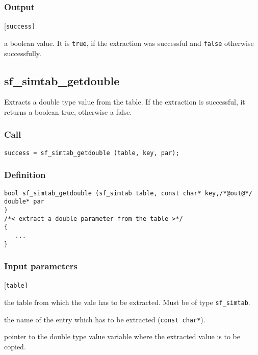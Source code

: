 \subsubsection*{Output}
\begin{desclist}{\tt }{\quad}[\tt success]
   \setlength\itemsep{0pt}
   \item[success] a boolean value. It is \texttt{true}, if the extraction was successful and \texttt{false} otherwise successfully.
\end{desclist}




\subsection{{sf\_simtab\_getdouble}}\label{sec:sf_simtab_getdouble}
Extracts a double type value from the table. If the extraction is successful, it returns a boolean true, otherwise a false. 

\subsubsection*{Call}
\begin{verbatim}success = sf_simtab_getdouble (table, key, par);\end{verbatim}

\subsubsection*{Definition}
\begin{verbatim}
bool sf_simtab_getdouble (sf_simtab table, const char* key,/*@out@*/ double* par
)
/*< extract a double parameter from the table >*/
{
   ...
}
\end{verbatim}

\subsubsection*{Input parameters}
\begin{desclist}{\tt }{\quad}[\tt table]
   \setlength\itemsep{0pt}
   \item[table] the table from which the vale has to be extracted. Must be of type \texttt{sf\_simtab}.
   \item[key]   the name of the entry which has to be extracted (\texttt{const char*}).
   \item[par]   pointer to the double type value variable where the extracted value is to be copied.
\end{desclist}

